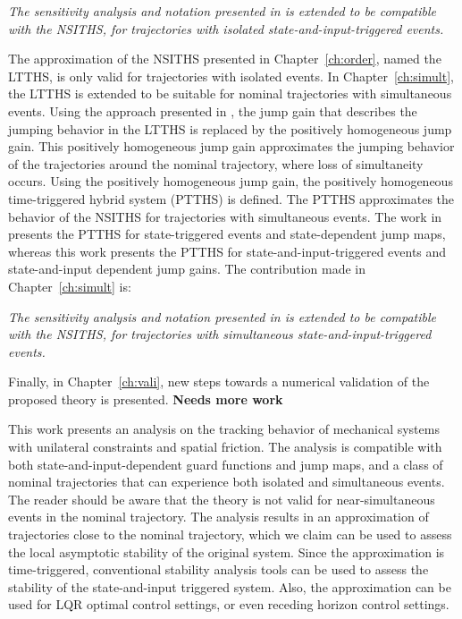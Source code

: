 \documentclass[../DC2017114Bouma.tex]{subfiles}
\begin{document}
\textit{The sensitivity analysis and notation presented in \cite{Rijnen2018a} is extended to be compatible with the NSITHS, for trajectories with isolated state-and-input-triggered events.}

The approximation of the NSITHS presented in Chapter~\ref{ch:order}, named the LTTHS, is only valid for trajectories with isolated events. In Chapter~\ref{ch:simult}, the LTTHS is extended to be suitable for nominal trajectories with simultaneous events. Using the approach presented in \cite{Rijnen2018}, the jump gain that describes the jumping behavior in the LTTHS is replaced by the positively homogeneous jump gain. This positively homogeneous jump gain approximates the jumping behavior of the trajectories around the nominal trajectory, where loss of simultaneity occurs. Using the positively homogeneous jump gain, the positively homogeneous time-triggered hybrid system (PTTHS) is defined. The PTTHS approximates the behavior of the NSITHS for trajectories with simultaneous events. The work in \cite{Rijnen2018a} presents the PTTHS for state-triggered events and state-dependent jump maps, whereas this work presents the PTTHS for state-and-input-triggered events and state-and-input dependent jump gains. The contribution made in Chapter~\ref{ch:simult} is:

\textit{The sensitivity analysis and notation presented in \cite{Rijnen2018a} is extended to be compatible with the NSITHS, for trajectories with simultaneous state-and-input-triggered events.}

Finally, in Chapter~\ref{ch:vali}, new steps towards a numerical validation of the proposed theory is presented. \textbf{Needs more work}

This work presents an analysis on the tracking behavior of mechanical systems with unilateral constraints and spatial friction. The analysis is compatible with both state-and-input-dependent guard functions and jump maps, and a class of nominal trajectories that can experience both isolated and simultaneous events. The reader should be aware that the theory is not valid for near-simultaneous events in the nominal trajectory. The analysis results in an approximation of trajectories close to the nominal trajectory, which we claim can be used to assess the local asymptotic stability of the original system. Since the approximation is time-triggered, conventional stability analysis tools can be used to assess the stability of the state-and-input triggered system. Also, the approximation can be used for LQR optimal control settings, or even receding horizon control settings.
\end{document}
